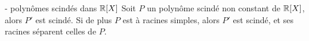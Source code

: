 


    \begin{proposition}{16.73}{ - polynômes scindés dans $\mathbb{R}[X]$}
        Soit $P$ un polynôme scindé non constant de $\mathbb{R}[X]$, alors $P'$ est scindé. Si de plus $P$ est à racines simples, alors $P'$ est scindé, et ses racines séparent celles de $P$.
    \end{proposition}
